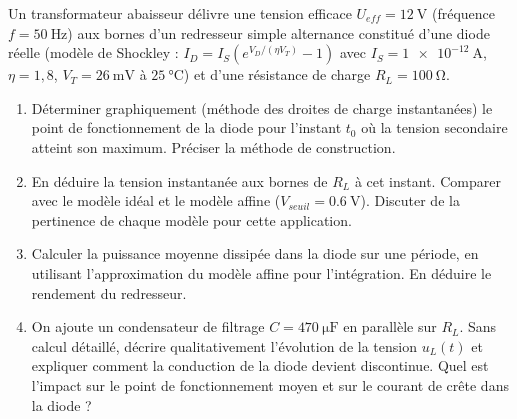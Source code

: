\documentclass[11pt]{article}
\begin{document}
\begin{exercice}
Un transformateur abaisseur délivre une tension efficace $U_{eff} = \SI{12}{\volt}$ (fréquence $f = \SI{50}{\hertz}$) aux bornes d'un redresseur simple alternance constitué d'une diode réelle (modèle de Shockley : $I_D = I_S(e^{V_D/(\eta V_T)}-1)$ avec $I_S = \SI{1e-12}{\ampere}$, $\eta = 1,8$, $V_T = \SI{26}{\milli\volt}$ à $\SI{25}{\celsius}$) et d'une résistance de charge $R_L = \SI{100}{\ohm}$.
\begin{enumerate}
    \item Déterminer graphiquement (méthode des droites de charge instantanées) le point de fonctionnement de la diode pour l'instant $t_0$ où la tension secondaire atteint son maximum. Préciser la méthode de construction.
    \item En déduire la tension instantanée aux bornes de $R_L$ à cet instant. Comparer avec le modèle idéal et le modèle affine ($V_{seuil} = \SI{0,6}{\volt}$). Discuter de la pertinence de chaque modèle pour cette application.
    \item Calculer la puissance moyenne dissipée dans la diode sur une période, en utilisant l'approximation du modèle affine pour l'intégration. En déduire le rendement du redresseur.
    \item On ajoute un condensateur de filtrage $C = \SI{470}{\micro\farad}$ en parallèle sur $R_L$. Sans calcul détaillé, décrire qualitativement l'évolution de la tension $u_L(t)$ et expliquer comment la conduction de la diode devient discontinue. Quel est l'impact sur le point de fonctionnement moyen et sur le courant de crête dans la diode ?
\end{enumerate}
\end{exercice}
\end{document}
